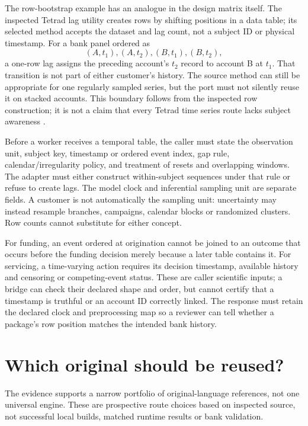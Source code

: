 The row-bootstrap example has an analogue in the design matrix itself. The
inspected Tetrad lag utility creates rows by shifting positions in a data table;
its selected method accepts the dataset and lag count, not a subject ID or
physical timestamp. For a bank panel ordered as
\[
  (A,t_1),(A,t_2),(B,t_1),(B,t_2),
\]
a one-row lag assigns the preceding account's $t_2$ record to account B at
$t_1$. That transition is not part of either customer's history. The source
method can still be appropriate for one regularly sampled series, but the
port must not silently reuse it on stacked accounts. This boundary follows
from the inspected row construction; it is not a claim that every Tetrad time
series route lacks subject awareness \citep{exec15_javatemporal_tetrad}.

Before a worker receives a temporal table, the caller must state the
observation unit, subject key, timestamp or ordered event index, gap rule,
calendar/irregularity policy, and treatment of resets and overlapping windows.
The adapter must either construct within-subject sequences under that rule or
refuse to create lags. The model clock and inferential sampling unit are
separate fields. A customer is not automatically the sampling unit: uncertainty
may instead resample branches, campaigns, calendar blocks or randomized
clusters. Row counts cannot substitute for either concept.

For funding, an event ordered at origination cannot be joined to an outcome
that occurs before the funding decision merely because a later table contains
it. For servicing, a time-varying action requires its decision timestamp,
available history and censoring or competing-event status. These are caller
scientific inputs; a bridge can check their declared shape and order, but
cannot certify that a timestamp is truthful or an account ID correctly linked.
The response must retain the declared clock and preprocessing map so a
reviewer can tell whether a package's row position matches the intended bank
history.

\section{Which original should be reused?}

The evidence supports a narrow portfolio of original-language references, not
one universal engine. These are prospective route choices based on inspected
source, not successful local builds, matched runtime results or bank
validation.

